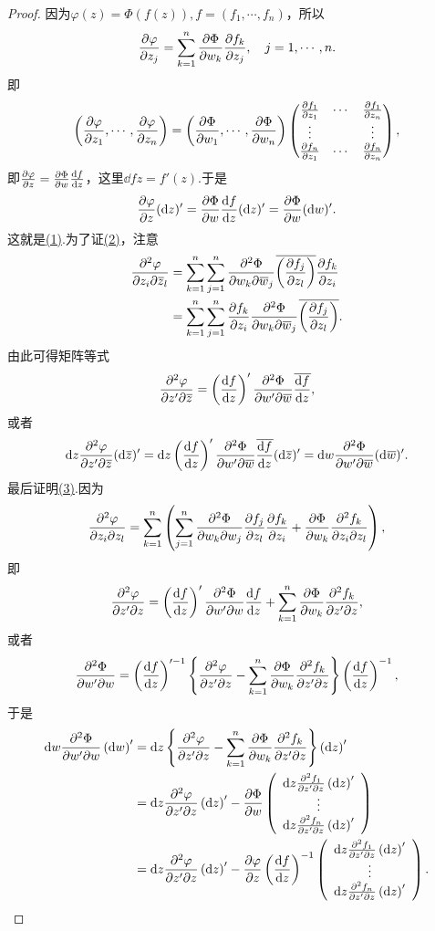 \begin{proof}
	因为$\varphi(z)=\Phi(f(z)),f=(f_1,\cdots,f_n)$，所以
	\[\pp{\varphi}{z_j}=\sum_{k=1}^{n}\pp{\Phi}{w_k}\pp{f_k}{z_j},\quad j=1,\cdots,n.\]
	即
	\[\left(\pp{\varphi}{z_1},\cdots,\pp{\varphi}{z_n}\right)=\left(\pp{\Phi}{w_1},\cdots,\pp{\Phi}{w_n}\right)\begin{pmatrix}
		\pp{f_1}{z_1} & \cdots & \pp{f_1}{z_n}\\
		\vdots & & \vdots\\
		\pp{f_n}{z_1} & \cdots & \pp{f_n}{z_n}
	\end{pmatrix},\]
即$\pp{\varphi}{z}=\pp{\Phi}{w}\dd{f}{z}$，这里$\dd{f}{z}=f'(z)$.于是
\[\pp{\varphi}{z}(\mathrm{d}z)'=\pp{\Phi}{w}\dd{f}{z}(\mathrm{d}z)'=\pp{\Phi}{w}(\mathrm{d}w)'.\]
这就是\hyperlink{2.5.10}{(1)}.为了证\hyperlink{2.5.10}{(2)}，注意
\begin{align*}
	\pppp{\varphi}{z_i}{\bar{z}_l}
	&=\sum_{k=1}^{n}\sum_{j=1}^{n}\pppp{\Phi}{w_k}{\bar{w}_j}\bar{\left(\pp{f_j}{z_l}\right)}\pp{f_k}{z_i}\\
	&=\sum_{k=1}^{n}\sum_{j=1}^{n}\pp{f_k}{z_i}\pppp{\Phi}{w_k}{\bar{w}_j}\bar{\left(\pp{f_j}{z_l}\right)}.
\end{align*}
由此可得矩阵等式
\[\pppp{\varphi}{z'}{\bar{z}}=\left(\dd{f}{z}\right)'\pppp{\Phi}{w'}{\bar{w}}\bar{\dd{f}{z}},\]
或者
\[\mathrm{d}z\pppp{\varphi}{z'}{\bar{z}}(\mathrm{d}\bar{z})'=\mathrm{d}z\left(\dd{f}{z}\right)'\pppp{\Phi}{w'}{\bar{w}}\bar{\dd{f}{z}}(\mathrm{d}\bar{z})'=\mathrm{d}w\pppp{\Phi}{w'}{\bar{w}}(\mathrm{d}\bar{w})'.\]
最后证明\hyperlink{2.5.10}{(3)}.因为
\[\pppp{\varphi}{z_i}{z_l}=\sum_{k=1}^{n}\left(\sum_{j=1}^{n}\pppp{\Phi}{w_k}{w_j}\pp{f_j}{z_l}\pp{f_k}{z_i}+\pp{\Phi}{w_k}\pppp{f_k}{z_i}{z_l}\right),\]
即
\[\pppp{\varphi}{z'}{z}=\left(\dd{f}{z}\right)'\pppp{\Phi}{w'}{w}\dd{f}{z}+\sum_{k=1}^{n}\pp{\Phi}{w_k}\pppp{f_k}{z'}{z},\]
或者
\[\pppp{\Phi}{w'}{w}=\left(\dd{f}{z}\right)'^{-1}\left\{\pppp{\varphi}{z'}{z}-\sum_{k=1}^{n}\pp{\Phi}{w_k}\pppp{f_k}{z'}{z}\right\}\left(\dd{f}{z}\right)^{-1},\]
于是
\begin{align*}
	\mathrm{d}w\pppp{\Phi}{w'}{w}\left(\mathrm{d}w\right)'
	&=\mathrm{d}z\left\{\pppp{\varphi}{z'}{z}-\sum_{k=1}^{n}\pp{\Phi}{w_k}\pppp{f_k}{z'}{z}\right\}\left(\mathrm{d}z\right)'\\
	&=\mathrm{d}z\pppp{\varphi}{z'}{z}\left(\mathrm{d}z\right)'-\pp{\Phi}{w}\left(
	\begin{array}{ccc}
		\mathrm{d}z\pppp{f_1}{z'}{z}\left(\mathrm{d}z\right)'\\
		\vdots\\
		\mathrm{d}z\pppp{f_n}{z'}{z}\left(\mathrm{d}z\right)'
	\end{array}\right)\\
&=\mathrm{d}z\pppp{\varphi}{z'}{z}\left(\mathrm{d}z\right)'-\pp{\varphi}{z}\left(\dd{f}{z}\right)^{-1}\left(
\begin{array}{ccc}
	\mathrm{d}z\pppp{f_1}{z'}{z}\left(\mathrm{d}z\right)'\\
	\vdots\\
	\mathrm{d}z\pppp{f_n}{z'}{z}\left(\mathrm{d}z\right)'
\end{array}\right).\qedhere
\end{align*}
\end{proof}
